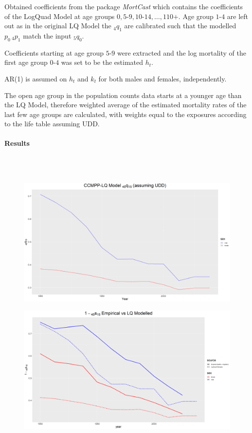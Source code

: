 \documentclass[12pt,a4paper]{article}
\begin{document}
Obtained coefficients from the package \textit{MortCast} which contains the coefficients of the LogQuad Model at age groups $0, 5\text{-}9, 10\text{-}14, \dots, 110\text{+}$. Age group $1\text{-}4$ are left out as in the original LQ Model the $_4q_1$ are calibrated such that the modelled $p_0 \, _4p_1$ match the input $_5q_0$. 

Coefficients starting at age group $5\text{-}9$ were extracted and the log mortality of the first age group $0\text{-}4$ was set to be the estimated $h_t$.
 
AR(1) is assumed on $h_t$ and $k_t$ for both males and females, independently.

The open age group in the population counts data starts at a younger age than the LQ Model, therefore weighted average of the estimated mortality rates of the last few age groups are calculated, with weights equal to the exposures according to the life table assuming UDD.

\newpage
\paragraph{Results} \\~\\

\begin{figure}[H]
\includegraphics[width=\linewidth]{Burkina Faso/CCMPP q4515.png}
\end{figure}
\begin{figure}[H]
\includegraphics[width=\linewidth]{Burkina Faso/CCMPP 1-s4515.png}
\end{figure}
\end{document}
